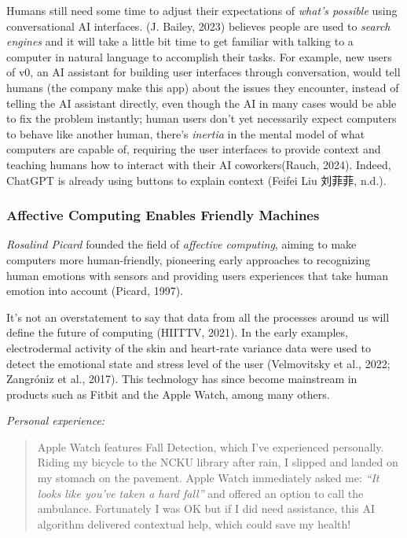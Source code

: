\documentclass[
  letterpaper,
  DIV=11,
  numbers=noendperiod]{scrartcl}
\begin{document}
Humans still need some time to adjust their expectations of \emph{what's
possible} using conversational AI interfaces. (J. Bailey, 2023) believes
people are used to \emph{search engines} and it will take a little bit
time to get familiar with talking to a computer in natural language to
accomplish their tasks. For example, new users of v0, an AI assistant
for building user interfaces through conversation, would tell humans
(the company make this app) about the issues they encounter, instead of
telling the AI assistant directly, even though the AI in many cases
would be able to fix the problem instantly; human users don't yet
necessarily expect computers to behave like another human, there's
\emph{inertia} in the mental model of what computers are capable of,
requiring the user interfaces to provide context and teaching humans how
to interact with their AI coworkers(Rauch, 2024). Indeed, ChatGPT is
already using buttons to explain context (Feifei Liu 刘菲菲, n.d.).

\subsubsection{Affective Computing Enables Friendly
Machines}\label{affective-computing-enables-friendly-machines}

\emph{Rosalind Picard} founded the field of \emph{affective computing},
aiming to make computers more human-friendly, pioneering early
approaches to recognizing human emotions with sensors and providing
users experiences that take human emotion into account (Picard, 1997).

It's not an overstatement to say that data from all the processes around
us will define the future of computing (HIITTV, 2021). In the early
examples, electrodermal activity of the skin and heart-rate variance
data were used to detect the emotional state and stress level of the
user (Velmovitsky et al., 2022; Zangróniz et al., 2017). This technology
has since become mainstream in products such as Fitbit and the Apple
Watch, among many others.

\emph{Personal experience:}

\begin{quote}
Apple Watch features Fall Detection, which I've experienced personally.
Riding my bicycle to the NCKU library after rain, I slipped and landed
on my stomach on the pavement. Apple Watch immediately asked me:
\emph{``It looks like you've taken a hard fall''} and offered an option
to call the ambulance. Fortunately I was OK but if I did need
assistance, this AI algorithm delivered contextual help, which could
save my health!
\end{quote}
\end{document}
